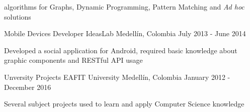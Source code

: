 \begin{cventries}
{\begin{cvitems}
{               algorithms for Graphs, Dynamic Programming, Pattern Matching and \textit{Ad hoc}
               solutions}
      \end{cvitems}
    }
  \cventry
    {Mobile Devices Developer}
    {IdeasLab}
    {Medellín, Colombia}
    {July 2013 - June 2014}
    {
      \begin{cvitems}
        \item {Developed a social application for Android, required basic knowledge about graphic
               components and RESTful API usage}
      \end{cvitems}
      \begin{cvsubentries}
      \end{cvsubentries}
    }
    \cventry
      {Unversity Projects}
      {EAFIT University}
      {Medellín, Colombia}
      {January 2012 - December 2016}
      {
        \begin{cvitems}
          \item {Several subject projects used to learn and apply Computer Science knowledge}
        \end{cvitems}
        \begin{cvsubentries}
        \end{cvsubentries}
      }
\end{cventries}
